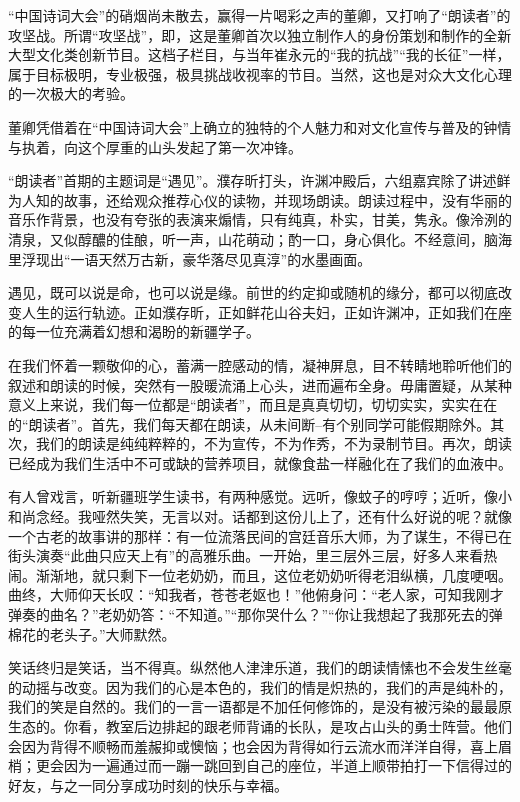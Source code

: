 \documentclass[openany]{ctexbook}
\begin{document}
``中国诗词大会''的硝烟尚未散去，赢得一片喝彩之声的董卿，又打响了``朗读者''的攻坚战。所谓``攻坚战''，即，这是董卿首次以独立制作人的身份策划和制作的全新大型文化类创新节目。这档子栏目，与当年崔永元的``我的抗战''``我的长征''一样，属于目标极明，专业极强，极具挑战收视率的节目。当然，这也是对众大文化心理的一次极大的考验。

董卿凭借着在``中国诗词大会''上确立的独特的个人魅力和对文化宣传与普及的钟情与执着，向这个厚重的山头发起了第一次冲锋。

``朗读者''首期的主题词是``遇见''。濮存昕打头，许渊冲殿后，六组嘉宾除了讲述鲜为人知的故事，还给观众推荐心仪的读物，并现场朗读。朗读过程中，没有华丽的音乐作背景，也没有夸张的表演来煽情，只有纯真，朴实，甘美，隽永。像泠洌的清泉，又似醇醲的佳酿，听一声，山花萌动；酌一口，身心俱化。不经意间，脑海里浮现出``一语天然万古新，豪华落尽见真淳''的水墨画面。

遇见，既可以说是命，也可以说是缘。前世的约定抑或随机的缘分，都可以彻底改变人生的运行轨迹。正如濮存昕，正如鲜花山谷夫妇，正如许渊冲，正如我们在座的每一位充满着幻想和渴盼的新疆学子。

在我们怀着一颗敬仰的心，蓄满一腔感动的情，凝神屏息，目不转睛地聆听他们的叙述和朗读的时候，突然有一股暖流涌上心头，进而遍布全身。毋庸置疑，从某种意义上来说，我们每一位都是``朗读者''，而且是真真切切，切切实实，实实在在的``朗读者''。首先，我们每天都在朗读，从未间断--有个别同学可能假期除外。其次，我们的朗读是纯纯粹粹的，不为宣传，不为作秀，不为录制节目。再次，朗读已经成为我们生活中不可或缺的营养项目，就像食盐一样融化在了我们的血液中。

有人曾戏言，听新疆班学生读书，有两种感觉。远听，像蚊子的哼哼；近听，像小和尚念经。我哑然失笑，无言以对。话都到这份儿上了，还有什么好说的呢？就像一个古老的故事讲的那样：有一位流落民间的宫廷音乐大师，为了谋生，不得已在街头演奏``此曲只应天上有''的高雅乐曲。一开始，里三层外三层，好多人来看热闹。渐渐地，就只剩下一位老奶奶，而且，这位老奶奶听得老泪纵横，几度哽咽。曲终，大师仰天长叹：``知我者，苍苍老妪也！''他俯身问：``老人家，可知我刚才弹奏的曲名？''老奶奶答：``不知道。''``那你哭什么？''``你让我想起了我那死去的弹棉花的老头子。''大师默然。

笑话终归是笑话，当不得真。纵然他人津津乐道，我们的朗读情愫也不会发生丝毫的动摇与改变。因为我们的心是本色的，我们的情是炽热的，我们的声是纯朴的，我们的笑是自然的。我们的一言一语都是不加任何修饰的，是没有被污染的最最原生态的。你看，教室后边排起的跟老师背诵的长队，是攻占山头的勇士阵营。他们会因为背得不顺畅而羞赧抑或懊恼；也会因为背得如行云流水而洋洋自得，喜上眉梢；更会因为一遍通过而一蹦一跳回到自己的座位，半道上顺带拍打一下信得过的好友，与之一同分享成功时刻的快乐与幸福。
\end{document}
